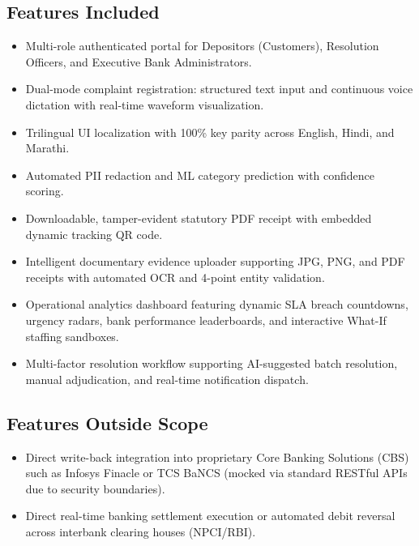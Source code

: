 \subsection{Features Included}
\begin{itemize}
    \item Multi-role authenticated portal for Depositors (Customers), Resolution Officers, and Executive Bank Administrators.
    \item Dual-mode complaint registration: structured text input and continuous voice dictation with real-time waveform visualization.
    \item Trilingual UI localization with 100\% key parity across English, Hindi, and Marathi.
    \item Automated PII redaction and ML category prediction with confidence scoring.
    \item Downloadable, tamper-evident statutory PDF receipt with embedded dynamic tracking QR code.
    \item Intelligent documentary evidence uploader supporting JPG, PNG, and PDF receipts with automated OCR and 4-point entity validation.
    \item Operational analytics dashboard featuring dynamic SLA breach countdowns, urgency radars, bank performance leaderboards, and interactive What-If staffing sandboxes.
    \item Multi-factor resolution workflow supporting AI-suggested batch resolution, manual adjudication, and real-time notification dispatch.
\end{itemize}

\subsection{Features Outside Scope}
\begin{itemize}
    \item Direct write-back integration into proprietary Core Banking Solutions (CBS) such as Infosys Finacle or TCS BaNCS (mocked via standard RESTful APIs due to security boundaries).
    \item Direct real-time banking settlement execution or automated debit reversal across interbank clearing houses (NPCI/RBI).
\end{itemize}

